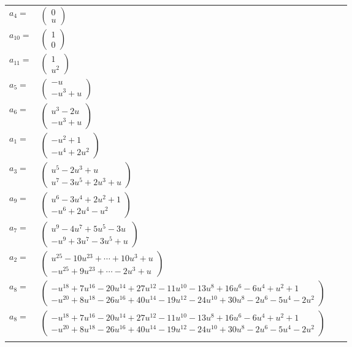 \documentclass[1p]{elsarticle_modified}
\theoremstyle{definition}
\begin{document}
\begin{tabular}{m{7pt} m{180pt} m{7pt} m{180pt} }
\flushright $a_{4}=$&$\begin{pmatrix}0\\u\end{pmatrix}$ \\
\flushright $a_{10}=$&$\begin{pmatrix}1\\0\end{pmatrix}$ \\
\flushright $a_{11}=$&$\begin{pmatrix}1\\u^2\end{pmatrix}$ \\
\flushright $a_{5}=$&$\begin{pmatrix}- u\\- u^3+u\end{pmatrix}$ \\
\flushright $a_{6}=$&$\begin{pmatrix}u^3-2 u\\- u^3+u\end{pmatrix}$ \\
\flushright $a_{1}=$&$\begin{pmatrix}- u^2+1\\- u^4+2 u^2\end{pmatrix}$ \\
\flushright $a_{3}=$&$\begin{pmatrix}u^5-2 u^3+u\\u^7-3 u^5+2 u^3+u\end{pmatrix}$ \\
\flushright $a_{9}=$&$\begin{pmatrix}u^6-3 u^4+2 u^2+1\\- u^6+2 u^4- u^2\end{pmatrix}$ \\
\flushright $a_{7}=$&$\begin{pmatrix}u^9-4 u^7+5 u^5-3 u\\- u^9+3 u^7-3 u^5+u\end{pmatrix}$ \\
\flushright $a_{2}=$&$\begin{pmatrix}u^{25}-10 u^{23}+\cdots+10 u^3+u\\- u^{25}+9 u^{23}+\cdots-2 u^3+u\end{pmatrix}$ \\
\flushright $a_{8}=$&$\begin{pmatrix}- u^{18}+7 u^{16}-20 u^{14}+27 u^{12}-11 u^{10}-13 u^8+16 u^6-6 u^4+u^2+1\\- u^{20}+8 u^{18}-26 u^{16}+40 u^{14}-19 u^{12}-24 u^{10}+30 u^8-2 u^6-5 u^4-2 u^2\end{pmatrix}$\\ \flushright $a_{8}=$&$\begin{pmatrix}- u^{18}+7 u^{16}-20 u^{14}+27 u^{12}-11 u^{10}-13 u^8+16 u^6-6 u^4+u^2+1\\- u^{20}+8 u^{18}-26 u^{16}+40 u^{14}-19 u^{12}-24 u^{10}+30 u^8-2 u^6-5 u^4-2 u^2\end{pmatrix}$\\&\end{tabular}
\end{document}
